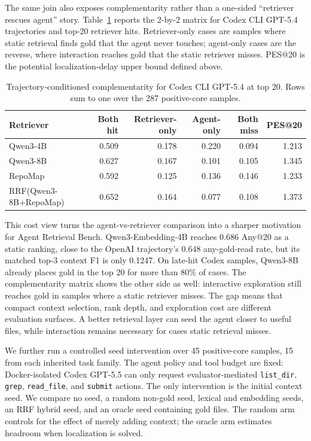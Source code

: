 \documentclass[11pt]{article}
\newcommand{\arb}{Agent Retrieval Bench}
\newcommand{\code}[1]{\texttt{#1}}
\begin{document}
The same join also exposes complementarity rather than a one-sided ``retriever rescues agent'' story. Table~\ref{tab:complementarity} reports the 2-by-2 matrix for Codex CLI GPT-5.4 trajectories and top-20 retriever hits. Retriever-only cases are samples where static retrieval finds gold that the agent never touches; agent-only cases are the reverse, where interaction reaches gold that the static retriever misses. PES@20 is the potential localization-delay upper bound defined above.

\begin{table}[t]
\centering
\caption{Trajectory-conditioned complementarity for Codex CLI GPT-5.4 at top 20. Rows sum to one over the 287 positive-core samples.}
\label{tab:complementarity}
\begin{tabular}{lrrrrr}
\toprule
Retriever & Both hit & Retriever-only & Agent-only & Both miss & PES@20 \\
\midrule
Qwen3-4B & 0.509 & 0.178 & 0.220 & 0.094 & 1.213 \\
Qwen3-8B & 0.627 & 0.167 & 0.101 & 0.105 & 1.345 \\
RepoMap & 0.592 & 0.125 & 0.136 & 0.146 & 1.233 \\
RRF(Qwen3-8B+RepoMap) & 0.652 & 0.164 & 0.077 & 0.108 & 1.373 \\
\bottomrule
\end{tabular}
\end{table}

This cost view turns the agent-vs-retriever comparison into a sharper motivation for \arb{}. Qwen3-Embedding-4B reaches 0.686 Any@20 as a static ranking, close to the OpenAI trajectory's 0.648 any-gold-read rate, but its matched top-3 context F1 is only 0.1247. On late-hit Codex samples, Qwen3-8B already places gold in the top 20 for more than 80\% of cases. The complementarity matrix shows the other side as well: interactive exploration still reaches gold in samples where a static retriever misses. The gap means that compact context selection, rank depth, and exploration cost are different evaluation surfaces. A better retrieval layer can seed the agent closer to useful files, while interaction remains necessary for cases static retrieval misses.

We further run a controlled seed intervention over 45 positive-core samples, 15 from each inherited task family. The agent policy and tool budget are fixed: Docker-isolated Codex GPT-5.5 can only request evaluator-mediated \code{list\_dir}, \code{grep}, \code{read\_file}, and \code{submit} actions. The only intervention is the initial context seed. We compare no seed, a random non-gold seed, lexical and embedding seeds, an RRF hybrid seed, and an oracle seed containing gold files. The random arm controls for the effect of merely adding context; the oracle arm estimates headroom when localization is solved.
\end{document}
